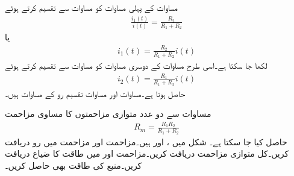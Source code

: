 مساوات  کے پہلی مساوات  کو مساوات  سے تقسیم کرتے ہوئے
\begin{align*}
\frac{i_1(t)}{i(t)}=\frac{R_2}{R_1+R_2}
\end{align*}
یا
\begin{align}\label{مساوات_مزاحمتی_تقسیم_رو_کی_مساوات_الف}
i_1(t)=\frac{R_2}{R_1+R_2} i(t)
\end{align}
لکھا جا سکتا ہے۔اسی طرح مساوات  کے دوسری مساوات  کو مساوات  سے تقسیم کرتے ہوئے
\begin{align}\label{مساوات_مزاحمتی_تقسیم_رو_کی_مساوات_ب}
i_2(t)=\frac{R_1}{R_1+R_2} i(t)
\end{align}
حاصل ہوتا ہے۔مساوات  اور مساوات  تقسیم رو کے مساوات ہیں۔

مساوات  سے دو عدد متوازی مزاحمتوں کا مساوی مزاحمت 
\begin{align}
R_m=\frac{R_1 R_2}{R_1+R_2}
\end{align}
حاصل کیا جا سکتا ہے۔ 
شکل  میں ،  اور  ہیں۔مزاحمت  اور مزاحمت  میں رو دریافت کریں۔کل متوازی مزاحمت دریافت کریں۔مزاحمت  اور  میں طاقت کا ضیاع دریافت کریں۔منبع کی طاقت بھی حاصل کریں۔

